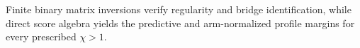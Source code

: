 Finite binary matrix inversions verify regularity and bridge identification, while direct score algebra yields the predictive and arm-normalized profile margins for every prescribed \(\chi>1\).